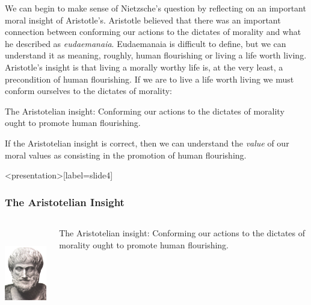 We can begin to make sense of Nietzsche's question by reflecting on an important moral insight of Aristotle's. Aristotle believed that there was an important connection between conforming our actions to the dictates of morality and what he described as \emph{eudaemanaia}. Eudaemanaia is difficult to define, but we can understand it as meaning, roughly, human flourishing or living a life worth living. Aristotle's insight is that living a morally worthy life is, at the very least, a precondition of human flourishing. If we are to live a life worth living we must conform ourselves to the dictates of morality:
\begin{definition}\label{def:aristotle}
    The Aristotelian insight: Conforming our actions to the dictates of morality ought to promote human flourishing.
\end{definition}
If the Aristotelian insight is correct, then we can understand the \emph{value} of our moral values as consisting in the promotion of human flourishing. \change

\begin{frame}<presentation>[label=slide4]
    \frametitle{The Aristotelian Insight}
        \begin{columns}
            \begin{column}{3cm}
                \includegraphics[height=4cm]{../../../graphics/aristotle.jpg}
            \end{column}
            \begin{column}{7cm}
                \alert{The Aristotelian insight:} Conforming our actions to the dictates of morality ought to promote human flourishing.
            \end{column}
        \end{columns}
\end{frame}

